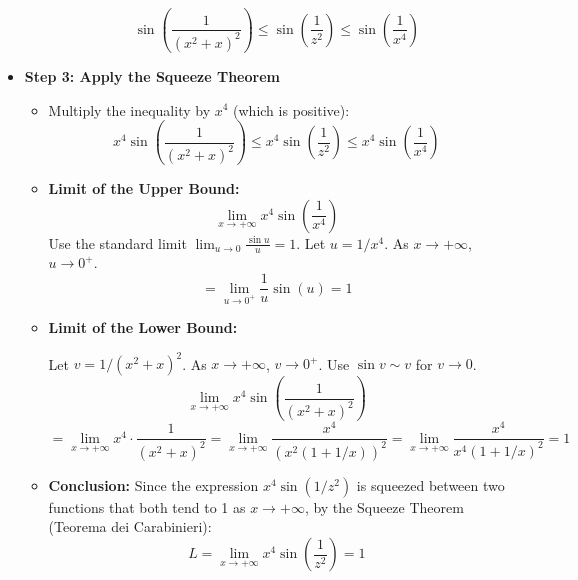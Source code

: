 \begin{cascade}
\begin{itemize}
\begin{itemize}
			            \[ \sin\left(\frac{1}{(x^2+x)^2}\right) \le \sin\left(\frac{1}{z^2}\right) \le \sin\left(\frac{1}{x^4}\right) \]
		      \end{itemize}
		\item \textbf{Step 3: Apply the Squeeze Theorem}
		      \begin{itemize}
			      \item Multiply the inequality by $x^4$ (which is positive):
			            \[ x^4 \sin\left(\frac{1}{(x^2+x)^2}\right) \le x^4 \sin\left(\frac{1}{z^2}\right) \le x^4 \sin\left(\frac{1}{x^4}\right) \]
			      \item \textbf{Limit of the Upper Bound:}
			            \[ \lim_{x \to +\infty} x^4 \sin\left(\frac{1}{x^4}\right) \]
			            Use the standard limit $\lim_{u \to 0} \frac{\sin u}{u} = 1$. Let $u = 1/x^4$. As $x \to +\infty$, $u \to 0^+$.
			            \[ = \lim_{u \to 0^+} \frac{1}{u} \sin(u) = 1 \]
			      \item \textbf{Limit of the Lower Bound:}

			            Let $v = 1/(x^2+x)^2$. As $x \to +\infty$, $v \to 0^+$. Use $\sin v \sim v$ for $v \to 0$.
			            \[ \lim_{x \to +\infty} x^4 \sin\left(\frac{1}{(x^2+x)^2}\right) \]
			            \[ = \lim_{x \to +\infty} x^4 \cdot \frac{1}{(x^2+x)^2} = \lim_{x \to +\infty} \frac{x^4}{(x^2(1+1/x))^2} = \lim_{x \to +\infty} \frac{x^4}{x^4(1+1/x)^2} = 1 \]
			      \item \textbf{Conclusion:} Since the expression $x^4 \sin(1/z^2)$ is squeezed between two functions that both tend to 1 as $x \to +\infty$, by the Squeeze Theorem (Teorema dei Carabinieri):
			            \[ L = \lim_{x \to +\infty} x^4 \sin\left(\frac{1}{z^2}\right) = 1 \]
		      \end{itemize}
	\end{itemize}
\end{cascade}

\hfill

